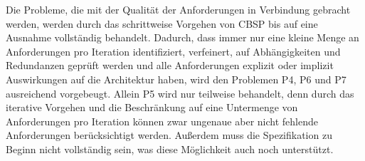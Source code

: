 Die Probleme, die mit der Qualit\"at der Anforderungen in Verbindung gebracht werden, werden durch das schrittweise Vorgehen von CBSP bis auf eine Ausnahme vollst\"andig behandelt. Dadurch, dass immer nur eine kleine Menge an Anforderungen pro Iteration identifiziert, verfeinert, auf Abh\"angigkeiten und Redundanzen gepr\"uft werden und alle Anforderungen explizit oder implizit Auswirkungen auf die Architektur haben, wird den Problemen P4, P6 und P7 ausreichend vorgebeugt. Allein P5 wird nur teilweise behandelt, denn durch das iterative Vorgehen und die Beschr\"ankung auf eine Untermenge von Anforderungen pro Iteration k\"onnen zwar ungenaue aber nicht fehlende Anforderungen ber\"ucksichtigt werden. Au\ss{}erdem muss die Spezifikation zu Beginn nicht vollst\"andig sein, was diese M\"oglichkeit auch noch unterst\"utzt. \\


%
